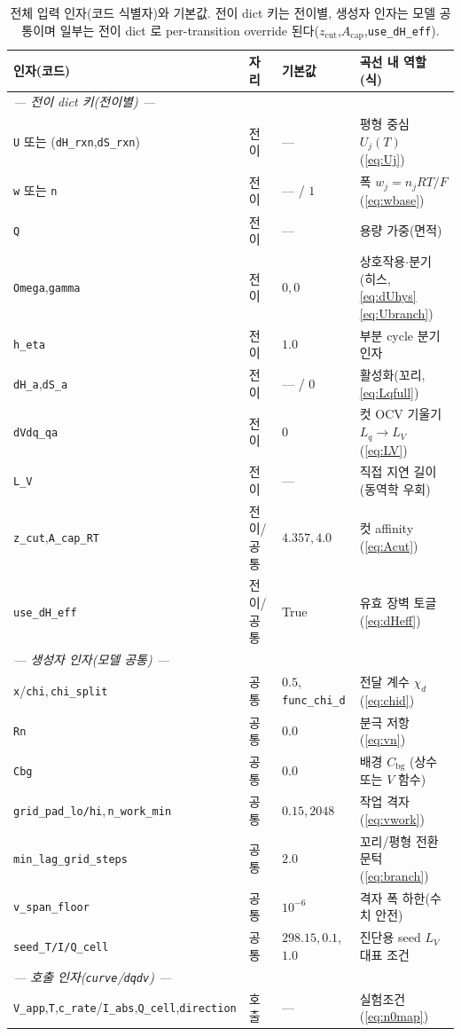 \documentclass[11pt,a4paper]{article}
\newcommand{\bg}{\mathrm{bg}}
\newcommand{\code}[1]{\texttt{#1}}
\begin{document}
\begin{table}[t]
\centering\footnotesize
\renewcommand{\arraystretch}{1.18}
\caption{전체 입력 인자(코드 식별자)와 기본값. 전이 dict 키는 전이별, 생성자 인자는 모델 공통이며 일부는 전이 dict 로
per-transition override 된다($z_\mathrm{cut}$,$A_\mathrm{cap}$,\code{use\_dH\_eff}).}
\label{tab:inputs}
\begin{tabular}{l l l l}
\toprule
인자(코드) & 자리 & 기본값 & 곡선 내 역할(식) \\
\midrule
\multicolumn{4}{l}{\emph{— 전이 dict 키(전이별) —}}\\
\code{U} 또는 (\code{dH\_rxn},\code{dS\_rxn}) & 전이 & --- & 평형 중심 $U_j(T)$ (\eqref{eq:Uj}) \\
\code{w} 또는 \code{n} & 전이 & --- / $1$ & 폭 $w_j=n_jRT/F$ (\eqref{eq:wbase}) \\
\code{Q} & 전이 & --- & 용량 가중(면적) \\
\code{Omega},\code{gamma} & 전이 & $0$,\,$0$ & 상호작용$\cdot$분기(히스, \eqref{eq:dUhys}\eqref{eq:Ubranch}) \\
\code{h\_eta} & 전이 & $1.0$ & 부분 cycle 분기 인자 \\
\code{dH\_a},\code{dS\_a} & 전이 & --- / $0$ & 활성화(꼬리, \eqref{eq:Lqfull}) \\
\code{dVdq\_qa} & 전이 & $0$ & 컷 OCV 기울기 $L_q\!\to\!L_V$ (\eqref{eq:LV}) \\
\code{L\_V} & 전이 & --- & 직접 지연 길이(동역학 우회) \\
\code{z\_cut},\code{A\_cap\_RT} & 전이/공통 & $4.357$,\,$4.0$ & 컷 affinity (\eqref{eq:Acut}) \\
\code{use\_dH\_eff} & 전이/공통 & True & 유효 장벽 토글(\eqref{eq:dHeff}) \\
\multicolumn{4}{l}{\emph{— 생성자 인자(모델 공통) —}}\\
\code{x}/\code{chi},\,\code{chi\_split} & 공통 & $0.5$,\,\code{func\_chi\_d} & 전달 계수 $\chi_d$ (\eqref{eq:chid}) \\
\code{Rn} & 공통 & $0.0$ & 분극 저항 (\eqref{eq:vn}) \\
\code{Cbg} & 공통 & $0.0$ & 배경 $C_\bg$ (상수 또는 $V$ 함수) \\
\code{grid\_pad\_lo/hi},\,\code{n\_work\_min} & 공통 & $0.15$,\,$2048$ & 작업 격자 (\eqref{eq:vwork}) \\
\code{min\_lag\_grid\_steps} & 공통 & $2.0$ & 꼬리/평형 전환 문턱 (\eqref{eq:branch}) \\
\code{v\_span\_floor} & 공통 & $10^{-6}$ & 격자 폭 하한(수치 안전) \\
\code{seed\_T/I/Q\_cell} & 공통 & $298.15$,\,$0.1$,\,$1.0$ & 진단용 seed $L_V$ 대표 조건 \\
\multicolumn{4}{l}{\emph{— 호출 인자(\code{curve}/\code{dqdv}) —}}\\
\code{V\_app},\code{T},\code{c\_rate}/\code{I\_abs},\code{Q\_cell},\code{direction} & 호출 & --- & 실험조건 (\eqref{eq:n0map}) \\
\bottomrule
\end{tabular}
\end{table}
\end{document}
